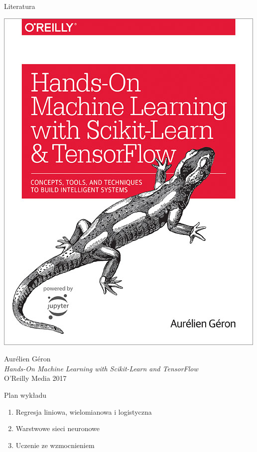 \documentclass{sa}
\begin{document}
\begin{frame}{Literatura}
\begin{minipage}{.5\textwidth}
\includegraphics[width=\textwidth]{handson.jpg}
\end{minipage}
\begin{minipage}{.49\textwidth}
Aurélien Géron\\
\emph{Hands-On Machine Learning with Scikit-Learn and TensorFlow}\\
O'Reilly Media 2017
\end{minipage}
\end{frame}
\begin{frame}{Plan wykładu}
\begin{enumerate}
\item Regresja liniowa, wielomianowa i logistyczna
\item Warstwowe sieci neuronowe
\item Uczenie ze wzmocnieniem
\end{enumerate}
\end{frame}
\end{document}
